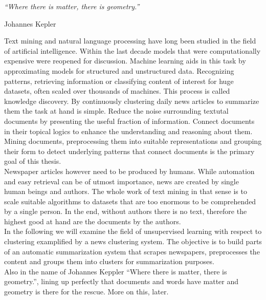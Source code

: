 \epigraph{\emph{
  ``Where there is matter, there is geometry.''
}}{ Johannes Kepler }

Text mining and natural language processing have long been studied in the field of artificial intelligence. Within the last decade models that were computationally expensive were reopened for discussion. Machine learning aids in this task by approximating models for structured and unstructured data. Recognizing patterns, retrieving information or classifying content of interest for huge datasets, often scaled over thousands of machines. This process is called knowledge discovery. By continuously clustering daily news articles to summarize them the task at hand is simple. Reduce the noise surrounding textutal documents by presenting the useful fraction of information. Connect documents in their topical logics to enhance the understanding and reasoning about them. Mining documents, preprocessing them into suitable representations and grouping their form to detect underlying patterns that connect documents is the primary goal of this thesis.\\
Newspaper articles however need to be produced by humans. While automation and easy retrieval can be of utmost importance, news are created by single human beings and authors. The whole work of text mining in that sense is to scale suitable algorithms to datasets that are too enormous to be comprehended by a single person. In the end, without authors there is no text, therefore the highest good at hand are the documents by the authors.\\
In the following we will examine the field of unsupervised learning with respect to clustering examplified by a news clustering system. The objective is to build parts of an automatic summarization system that scrapes newspapers, preprocesses the content and groups them into clusters for summarization purposes.\\
Also in the name of Johannes Keppler ``Where there is matter, there is geometry.'', lining up perfectly that documents and words have matter and geometry is there for the rescue. More on this, later.

